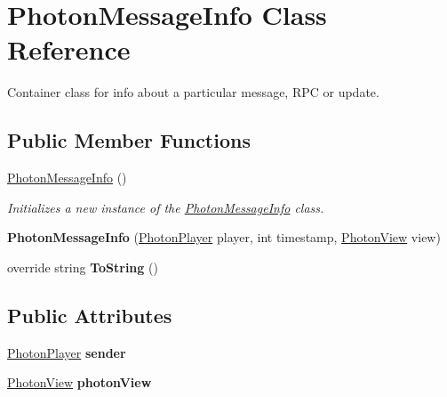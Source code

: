 \hypertarget{class_photon_message_info}{}\section{Photon\+Message\+Info Class Reference}
\label{class_photon_message_info}


Container class for info about a particular message, R\+PC or update.  


\subsection*{Public Member Functions}
\begin{DoxyCompactItemize}
\item 
\hyperlink{class_photon_message_info_adcd7a00ff6df6f431fb9de2db28f92b9}{Photon\+Message\+Info} ()
\begin{DoxyCompactList}\small\item\em Initializes a new instance of the \hyperlink{class_photon_message_info}{Photon\+Message\+Info} class. \end{DoxyCompactList}\item 
{\bfseries Photon\+Message\+Info} (\hyperlink{class_photon_player}{Photon\+Player} player, int timestamp, \hyperlink{class_photon_view}{Photon\+View} view)\hypertarget{class_photon_message_info_a8497209fff12bb41b79d010905e1cb39}{}\label{class_photon_message_info_a8497209fff12bb41b79d010905e1cb39}

\item 
override string {\bfseries To\+String} ()\hypertarget{class_photon_message_info_adf3bb70090d012d863d915f564e7018f}{}\label{class_photon_message_info_adf3bb70090d012d863d915f564e7018f}

\end{DoxyCompactItemize}
\subsection*{Public Attributes}
\begin{DoxyCompactItemize}
\item 
\hyperlink{class_photon_player}{Photon\+Player} {\bfseries sender}\hypertarget{class_photon_message_info_a08a4759b1a689d268bb1ea3cc99c5223}{}\label{class_photon_message_info_a08a4759b1a689d268bb1ea3cc99c5223}

\item 
\hyperlink{class_photon_view}{Photon\+View} {\bfseries photon\+View}\hypertarget{class_photon_message_info_a1244048dcad8a8c2332591dca458bfea}{}\label{class_photon_message_info_a1244048dcad8a8c2332591dca458bfea}

\end{DoxyCompactItemize}
